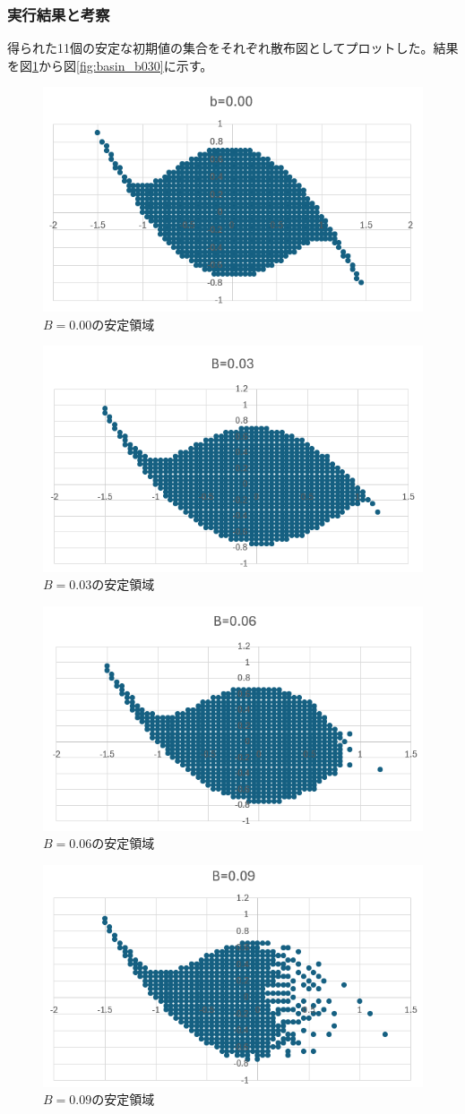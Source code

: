 \documentclass[dvipdfmx,a4paper]{jsarticle}
\begin{document}
\subsubsection{実行結果と考察}
得られた11個の安定な初期値の集合をそれぞれ散布図としてプロットした。結果を図\ref{fig:basin_b000}から図\ref{fig:basin_b030}に示す。

\begin{figure}[H]
    \centering
    \includegraphics[width=0.45\linewidth]{summer/software-engineering/images/b0.png}
    \caption{$B=0.00$の安定領域}
    \label{fig:basin_b000}
\end{figure}
\begin{figure}[H]
    \centering
    \includegraphics[width=0.45\linewidth]{summer/software-engineering/images/b0.03.png}
    \caption{$B=0.03$の安定領域}
    \label{fig:basin_b003}
\end{figure}
\begin{figure}[H]
    \centering
    \includegraphics[width=0.45\linewidth]{summer/software-engineering/images/b0.06.png}
    \caption{$B=0.06$の安定領域}
    \label{fig:basin_b006}
\end{figure}
\begin{figure}[H]
    \centering
    \includegraphics[width=0.45\linewidth]{summer/software-engineering/images/b0.09.png}
    \caption{$B=0.09$の安定領域}
    \label{fig:basin_b009}
\end{figure}
\end{document}
